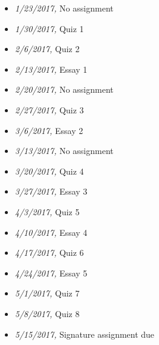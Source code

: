 \documentclass[article,oneside]{memoir}
\begin{document}
\begin{itemize}
\item \textit{1/23/2017,} No assignment 
\item \textit{1/30/2017,} Quiz 1
\item \textit{2/6/2017,} Quiz 2
\item \textit{2/13/2017,} Essay 1
\item \textit{2/20/2017,} No assignment
\item \textit{2/27/2017,} Quiz 3
\item \textit{3/6/2017,}  Essay 2
\item \textit{3/13/2017,}  No assignment
\item \textit{3/20/2017,} Quiz 4
\item \textit{3/27/2017,}  Essay 3
\item \textit{4/3/2017,} Quiz 5
\item \textit{4/10/2017,} Essay 4
\item \textit{4/17/2017,} Quiz 6
\item \textit{4/24/2017,} Essay 5
\item \textit{5/1/2017,} Quiz 7
\item \textit{5/8/2017,} Quiz 8
\item \textit{5/15/2017,} Signature assignment due
\end{itemize}



\end{document}

